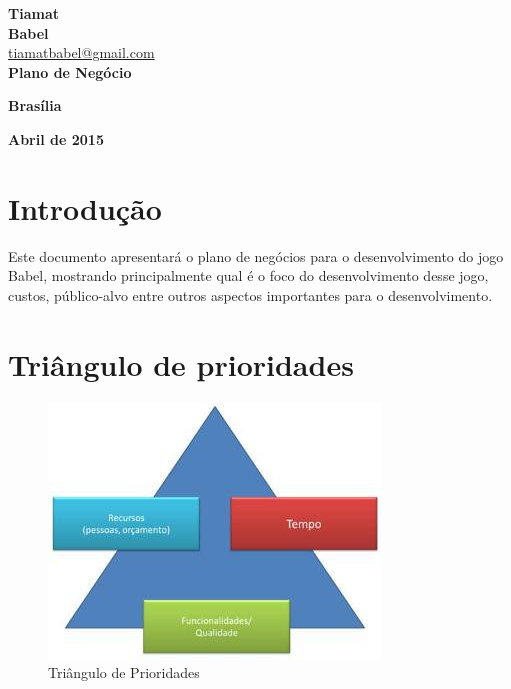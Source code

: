 \documentclass[11pt]{article} %
\begin{document}
\begin{titlepage}
 \vfill
  \begin{center}
   {\large \textbf{Tiamat}} \\
   {\large \textbf{Babel}}\\
   {\large \url{tiamatbabel@gmail.com}}\\[6cm]


   {\Large \textbf{Plano de Negócio}}\\

   \hspace{.45\textwidth} %
  \vfill

\vspace{2cm}

\large \textbf{Brasília}

\large \textbf{Abril de 2015}
\end{center}
\end{titlepage}
\newpage

\tableofcontents

\newpage


\section{Introdução}

Este documento apresentará o plano de negócios para o desenvolvimento do jogo Babel, mostrando principalmente qual é o foco do desenvolvimento desse jogo, custos, público-alvo entre outros aspectos importantes para o desenvolvimento.

\section{Triângulo de prioridades}

\begin{figure}[!htp]
\centering
\includegraphics[scale=0.75]{res/restrictions_triangle.jpg}
\caption{Triângulo de Prioridades}
\label{Prioridades}
\end{figure}
\end{document}
